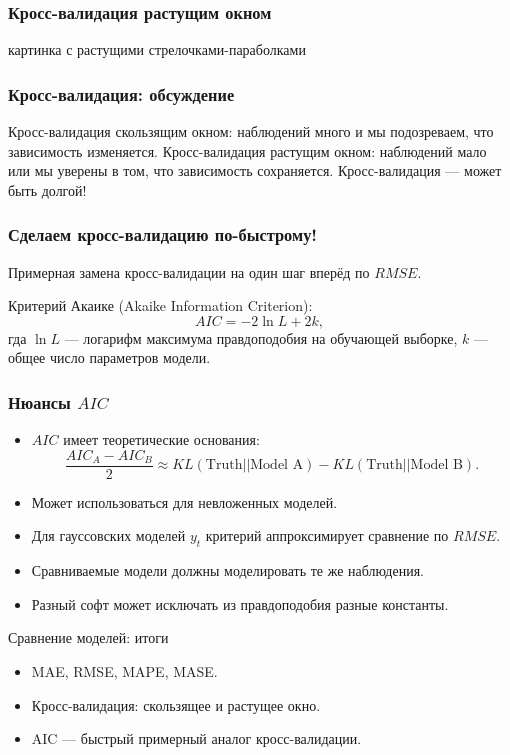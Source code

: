 \begin{frame}
    \frametitle{Кросс-валидация растущим окном}

    картинка с растущими стрелочками-параболками

\end{frame}


\begin{frame}
    \frametitle{Кросс-валидация: обсуждение}

    Кросс-валидация \alert{скользящим} окном: наблюдений много и мы подозреваем, что 
    зависимость изменяется.
    \pause
    Кросс-валидация \alert{растущим} окном: наблюдений мало или мы уверены 
    в том, что зависимость сохраняется.
    \pause
    Кросс-валидация — может быть долгой!

\end{frame}

\begin{frame}
    \frametitle{Сделаем кросс-валидацию по-быстрому!}

    Примерная замена кросс-валидации на один шаг вперёд по $RMSE$.

    \alert{Критерий Акаике} (Akaike Information Criterion):
    \pause
    \[
      AIC = -2 \ln L + 2k,
    \]
    гда $\ln L$ — логарифм максимума правдоподобия на обучающей выборке, $k$ — общее число параметров модели. 
    
\end{frame}

\begin{frame}
    \frametitle{Нюансы $AIC$}

    \begin{itemize}[<+->]
        \item $AIC$ имеет \alert{теоретические основания}:
        \[
            \frac{AIC_A - AIC_B}{2} \approx KL(\text{Truth} || \text{Model A}) - KL(\text{Truth} || \text{Model B}).
        \]
        \item Может использоваться \alert{для невложенных моделей}. 
        \item Для гауссовских моделей $y_t$ критерий аппроксимирует \alert{сравнение по $RMSE$}.
        \item Сравниваемые модели должны моделировать \alert{те же} наблюдения. 
        \item Разный софт может исключать из правдоподобия \alert{разные константы}. 
    \end{itemize}

    

\end{frame}


\begin{frame}{Сравнение моделей: итоги}

  \begin{itemize}[<+->]
    \item MAE, RMSE, MAPE, MASE.
    \item Кросс-валидация: скользящее и растущее окно.
    \item AIC — быстрый примерный аналог кросс-валидации. 
  \end{itemize}
\end{frame}



